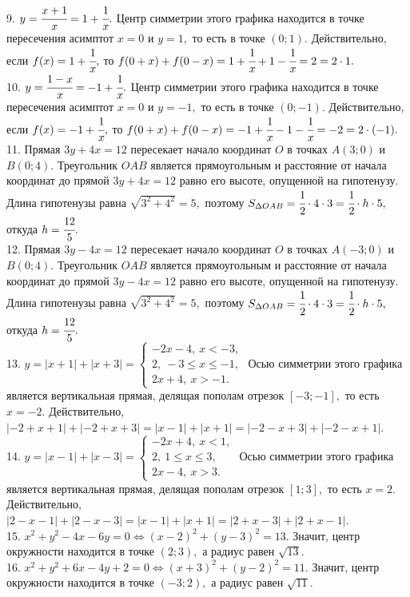 \documentclass[12pt]{article}
\begin{document}
9. $y=\cfrac{x+1}{x}=1+\cfrac{1}{x}.$ Центр симметрии этого графика находится в точке пересечения асимптот $x=0$ и $y=1,$ то есть в точке $(0;1).$ Действительно, если $f(x)=1+\cfrac{1}{x},$ то $f(0+x)+f(0-x)=1+\cfrac{1}{x}+1-\cfrac{1}{x}=2=2\cdot1.$\\
10. $y=\cfrac{1-x}{x}=-1+\cfrac{1}{x}.$ Центр симметрии этого графика находится в точке пересечения асимптот $x=0$ и $y=-1,$ то есть в точке $(0;-1).$ Действительно, если $f(x)=-1+\cfrac{1}{x},$ то $f(0+x)+f(0-x)=-1+\cfrac{1}{x}-1-\cfrac{1}{x}=-2=2\cdot(-1).$\\
11. Прямая $3y+4x=12$ пересекает начало координат $O$ в точках $A(3;0)$ и $B(0;4).$ Треугольник $OAB$ является прямоугольным и расстояние от начала координат до прямой $3y+4x=12$ равно его высоте, опущенной на гипотенузу. Длина гипотенузы равна $\sqrt{3^2+4^2}=5,$ поэтому $S_{\Delta OAB}=\cfrac{1}{2}\cdot4\cdot3=\cfrac{1}{2}\cdot h\cdot5,$ откуда $h=\cfrac{12}{5}.$\\
12. Прямая $3y-4x=12$ пересекает начало координат $O$ в точках $A(-3;0)$ и $B(0;4).$ Треугольник $OAB$ является прямоугольным и расстояние от начала координат до прямой $3y-4x=12$ равно его высоте, опущенной на гипотенузу. Длина гипотенузы равна $\sqrt{3^2+4^2}=5,$ поэтому $S_{\Delta OAB}=\cfrac{1}{2}\cdot4\cdot3=\cfrac{1}{2}\cdot h\cdot5,$ откуда $h=\cfrac{12}{5}.$\\
13. $y=|x+1|+|x+3|=\begin{cases}-2x-4,\ x<-3,\\ 2,\ -3\leqslant x\leqslant -1,\\ 2x+4,\ x>-1.\end{cases}$ Осью симметрии этого графика является вертикальная прямая, делящая пополам отрезок $[-3;-1],$ то есть $x=-2.$ Действительно, $|-2+x+1|+|-2+x+3|=|x-1|+|x+1|=|-2-x+3|+|-2-x+1|.$\\
14. $y=|x-1|+|x-3|=\begin{cases}-2x+4,\ x<1,\\ 2,\ 1\leqslant x\leqslant 3,\\ 2x-4,\ x>3.\end{cases}$ Осью симметрии этого графика является вертикальная прямая, делящая пополам отрезок $[1;3],$ то есть $x=2.$ Действительно, $|2-x-1|+|2-x-3|=|x-1|+|x+1|=|2+x-3|+|2+x-1|.$\\
15. $x^2+y^2-4x-6y=0\Leftrightarrow (x-2)^2+(y-3)^2=13.$ Значит, центр окружности находится в точке $(2;3),$ а радиус равен $\sqrt{13}.$\\
16. $x^2+y^2+6x-4y+2=0\Leftrightarrow (x+3)^2+(y-2)^2=11.$ Значит, центр окружности находится в точке $(-3;2),$ а радиус равен $\sqrt{11}.$\\
\end{document}
